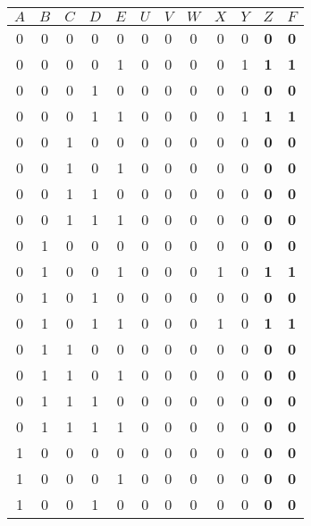 \begin{tabular}{ccccc|ccccc|cc}
  $A$ & $B$ & $C$ & $D$ & $E$ & $U$ & $V$ & $W$ & $X$ & $Y$ & \textbf{$Z$} & \textbf{$F$}\\
  \hline
   0  &  0  &  0  &  0  &  0  &  0  &  0  &  0  &  0  &  0  & \textbf{ 0 } & \textbf{ 0 }\\
   0  &  0  &  0  &  0  &  1  &  0  &  0  &  0  &  0  &  1  & \textbf{ 1 } & \textbf{ 1 }\\
   0  &  0  &  0  &  1  &  0  &  0  &  0  &  0  &  0  &  0  & \textbf{ 0 } & \textbf{ 0 }\\
   0  &  0  &  0  &  1  &  1  &  0  &  0  &  0  &  0  &  1  & \textbf{ 1 } & \textbf{ 1 }\\
   0  &  0  &  1  &  0  &  0  &  0  &  0  &  0  &  0  &  0  & \textbf{ 0 } & \textbf{ 0 }\\
   0  &  0  &  1  &  0  &  1  &  0  &  0  &  0  &  0  &  0  & \textbf{ 0 } & \textbf{ 0 }\\
   0  &  0  &  1  &  1  &  0  &  0  &  0  &  0  &  0  &  0  & \textbf{ 0 } & \textbf{ 0 }\\
   0  &  0  &  1  &  1  &  1  &  0  &  0  &  0  &  0  &  0  & \textbf{ 0 } & \textbf{ 0 }\\
   0  &  1  &  0  &  0  &  0  &  0  &  0  &  0  &  0  &  0  & \textbf{ 0 } & \textbf{ 0 }\\
   0  &  1  &  0  &  0  &  1  &  0  &  0  &  0  &  1  &  0  & \textbf{ 1 } & \textbf{ 1 }\\
   0  &  1  &  0  &  1  &  0  &  0  &  0  &  0  &  0  &  0  & \textbf{ 0 } & \textbf{ 0 }\\
   0  &  1  &  0  &  1  &  1  &  0  &  0  &  0  &  1  &  0  & \textbf{ 1 } & \textbf{ 1 }\\
   0  &  1  &  1  &  0  &  0  &  0  &  0  &  0  &  0  &  0  & \textbf{ 0 } & \textbf{ 0 }\\
   0  &  1  &  1  &  0  &  1  &  0  &  0  &  0  &  0  &  0  & \textbf{ 0 } & \textbf{ 0 }\\
   0  &  1  &  1  &  1  &  0  &  0  &  0  &  0  &  0  &  0  & \textbf{ 0 } & \textbf{ 0 }\\
   0  &  1  &  1  &  1  &  1  &  0  &  0  &  0  &  0  &  0  & \textbf{ 0 } & \textbf{ 0 }\\
   1  &  0  &  0  &  0  &  0  &  0  &  0  &  0  &  0  &  0  & \textbf{ 0 } & \textbf{ 0 }\\
   1  &  0  &  0  &  0  &  1  &  0  &  0  &  0  &  0  &  0  & \textbf{ 0 } & \textbf{ 0 }\\
   1  &  0  &  0  &  1  &  0  &  0  &  0  &  0  &  0  &  0  & \textbf{ 0 } & \textbf{ 0 }\\

\end{tabular}

